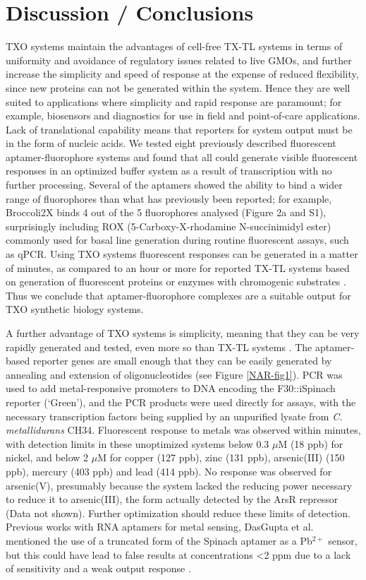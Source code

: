 \section{\textbf{Discussion / Conclusions}}
TXO systems maintain the advantages of cell-free TX-TL systems in terms of uniformity and avoidance of regulatory issues related to live GMOs, and further increase the simplicity and speed of response at the expense of reduced flexibility, since new proteins can not be generated within the system. Hence they are well suited to applications where simplicity and rapid response are paramount; for example, biosensors and diagnostics for use in field and point-of-care applications.
Lack of translational capability means that reporters for system output must be in the form of nucleic acids. We tested eight previously described fluorescent aptamer-fluorophore systems and found that all could generate visible fluorescent responses in an optimized buffer system as a result of transcription with no further processing. Several of the aptamers showed the ability to bind a wider range of fluorophores than what has previously been reported; for example, Broccoli2X binds 4 out of the 5 fluorophores analysed (Figure 2a and S1), surprisingly including ROX (5-Carboxy-X-rhodamine N-succinimidyl ester) commonly used for basal line generation during routine fluorescent assays, such as qPCR. Using TXO systems fluorescent responses can be generated in a matter of minutes, as compared to an hour or more for reported TX-TL systems based on generation of fluorescent proteins or enzymes with chromogenic substrates \cite{6, 23, 24, 25, 26, 27}. Thus we conclude that aptamer-fluorophore complexes are a suitable output for TXO synthetic biology systems. 

A further advantage of TXO systems is simplicity, meaning that they can be very rapidly generated and tested, even more so than TX-TL systems \cite{7}. The aptamer-based reporter genes are small enough that they can be easily generated by annealing and extension of oligonucleotides (see Figure \ref{NAR-fig1}). PCR was used to add metal-responsive promoters to DNA encoding the F30::iSpinach reporter (‘Green’), and the PCR products were used directly for assays, with the necessary transcription factors being supplied by an unpurified lysate from \textit{C. metallidurans} CH34. Fluorescent response to metals was observed within minutes, with detection limits in these unoptimized systems below 0.3 $\mu$M (18 ppb) for nickel, and below 2 $\mu$M for copper (127 ppb), zinc (131 ppb), arsenic(III) (150 ppb), mercury (403 ppb) and lead (414 ppb). No response was observed for arsenic(V), presumably because the system lacked the reducing power necessary to reduce it to arsenic(III), the form actually detected by the ArsR repressor (Data not shown). Further optimization should reduce these limits of detection. Previous works with RNA aptamers for metal sensing, DasGupta et al. mentioned the use of a truncated form of the Spinach aptamer as a Pb$^{2+}$ sensor, but this could have lead to false results at concentrations \textless 2 ppm due to a lack of sensitivity and a weak output response \cite{30}. 

